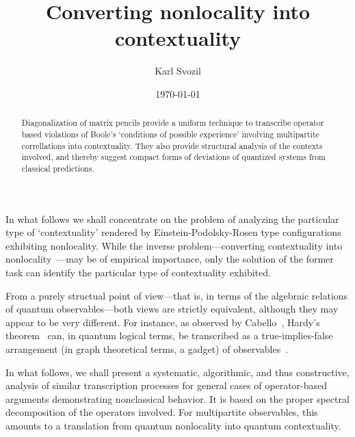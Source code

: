 \documentclass[
  twocolumn,
 showpacs,
 showkeys,
 preprintnumbers,
 amsmath,amssymb,
 aps,
 prl,
  longbibliography,
 floatfix,
 ]{revtex4-2}
\begin{document}
\title{Converting nonlocality into contextuality}



\author{Karl Svozil}




\date{\today}

\begin{abstract}
Diagonalization of matrix pencils provide a uniform technique to transcribe operator based violations of Boole's `conditions of possible experience' involving multipartite correllations into contextuality. They also provide structural analysis of the contexts involved, and thereby suggest compact forms of deviations of quantized systems from classical predictions.
\end{abstract}


\maketitle



In what follows we shall concentrate on the problem of analyzing the particular type of `contextuality' rendered by Einstein-Podolsky-Rosen type configurations exhibiting nonlocality.
While the inverse problem---converting contextuality into nonlocality~\cite{cabello2020converting}---may be of empirical importance,
only the solution of the former task can identify the particular type of contextuality exhibited.

From a purely structual point of view---that is, in terms of the algebraic relations of quantum observables---both views are strictly equivalent, although they may appear to be very different.
For instance, as observed by Cabello~\cite{cabello-96,cabello-97-nhvp,Cabello-2013-Hardylike}, Hardy's theorem~\cite{Hardy-92,Hardy-93}
can, in quantum logical terms, be  transcribed as a true-implies-false arrangement (in graph theoretical terms, a gadget) of observables~\cite{2018-minimalYIYS,svozil-2020-hardy}.

In what follows, we shall present a systematic, algorithmic, and thus constructive,
analysis of similar transcription processes for general cases of operator-based arguments demonstrating nonclassical behavior.
It is based on the proper spectral decomposition of the operators involved.
For multipartite observables, this amounts to a translation from quantum nonlocality into quantum contextuality.
\end{document}
